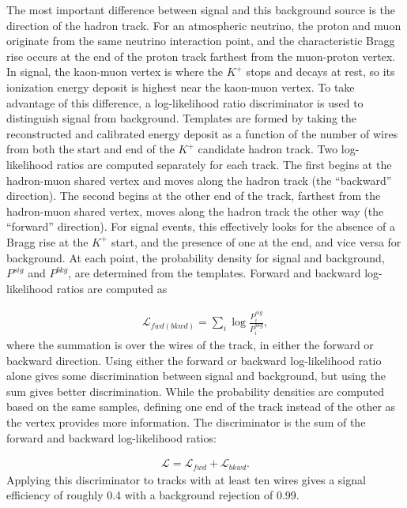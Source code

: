 The most important difference between signal and this background source is the direction of the hadron track. For an atmospheric neutrino, the proton and muon originate from the same neutrino interaction point, and the characteristic Bragg rise occurs at the end of the proton track farthest from the muon-proton vertex. In signal, the kaon-muon vertex is where the $K^{+}$ stops and decays at rest, so its ionization energy deposit is highest near the kaon-muon vertex.  To take advantage of this difference, a log-likelihood ratio discriminator is used to distinguish signal from background.  Templates are formed by taking the reconstructed and calibrated energy deposit as a function of the number of wires from both the start and end of the $K^{+}$ candidate hadron track. 
Two log-likelihood ratios are computed separately for each track. The first begins at the hadron-muon shared vertex and moves along the hadron track (the ``backward'' direction). The second begins at the other end of the track, farthest from the hadron-muon shared vertex, moves along the hadron track the other way (the ``forward'' direction). For signal events, this effectively looks for the absence of a Bragg rise at the $K^{+}$ start, and the presence of one at the end, and vice versa for background.  At each point, the probability density for signal and background, $P^{sig}$ and $P^{bkg}$, are determined from the templates. Forward and backward log-likelihood ratios are computed as

\begin{align}
 \mathcal{L}_{fwd(bkwd)} = \sum_{i} \log\frac{P^{sig}_i}{P^{bkg}_i}, 
\end{align}
where the summation is over the wires of the track, in either the forward or backward direction.  Using either the forward or backward log-likelihood ratio alone gives some discrimination between signal and background, but using the sum gives better discrimination. While the probability densities are computed based on the same samples, defining one end of the track instead of the other as the vertex provides more information. The discriminator is the sum of the forward and backward log-likelihood ratios:

\begin{align}
    \mathcal{L} = \mathcal{L}_{fwd} + \mathcal{L}_{bkwd}.\label{eqn:L}
\end{align}
Applying this discriminator to tracks with at least ten wires gives a signal efficiency of roughly \num{0.4} with a background rejection of \num{0.99}.

